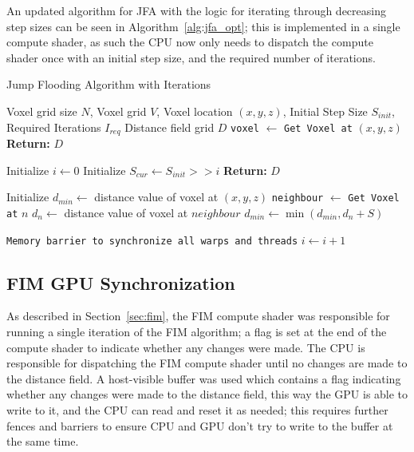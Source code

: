 An updated algorithm for JFA with the logic for iterating through decreasing step sizes can be seen in
Algorithm~\ref{alg:jfa_opt}; this is implemented in a single compute shader, as such the CPU now only needs to dispatch
the compute shader once with an initial step size, and the required number of iterations.

\begin{algorithm}[H]
    \caption{Jump Flooding Algorithm with Iterations}
    \label{alg:jfa_opt}
    \begin{algorithmic}[1]
        \REQUIRE Voxel grid size \(N\), Voxel grid \(V\), Voxel location \((x, y, z)\), Initial Step Size \(S_{init}\),
        Required Iterations \(I_{req}\)
        \ENSURE Distance field grid \(D\)
        \STATE \texttt{voxel} $\gets$ \texttt{Get Voxel at} \((x, y, z)\)
        \STATE \textbf{Return:} \(D\)
        \ENDIF

        \STATE Initialize $i \gets 0$
        \STATE Initialize $S_{cur} \gets S_{init} >> i$
        \STATE \textbf{Return:} \(D\)
        \ENDIF

        \STATE Initialize $d_{min} \gets$ distance value of voxel at \((x, y, z)\)
        \STATE \texttt{neighbour} $\gets$ \texttt{Get Voxel at} $n$
        \STATE $d_{n} \gets$ distance value of voxel at $neighbour$
        \STATE $d_{min} \gets \min(d_{min}, d_n + S)$
        \ENDFOR

        \STATE \texttt{Memory barrier to synchronize all warps and threads}
        \STATE $i \gets i + 1$
        \ENDFOR
    \end{algorithmic}
\end{algorithm}

\subsection{FIM GPU Synchronization} \label{sec:fim_gpu}
As described in Section~\ref{sec:fim}, the FIM compute shader was responsible for running a single iteration of the FIM
algorithm; a flag is set at the end of the compute shader to indicate whether any changes were made. The CPU is
responsible for dispatching the FIM compute shader until no changes are made to the distance field. A host-visible
buffer was used which contains a flag indicating whether any changes were made to the distance field, this way the GPU is
able to write to it, and the CPU can read and reset it as needed; this requires further fences and barriers to ensure
CPU and GPU don't try to write to the buffer at the same time.

